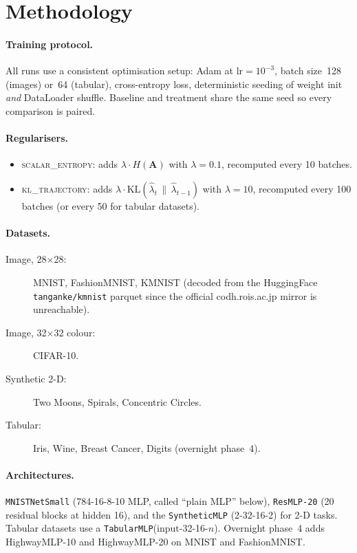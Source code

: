 \documentclass[11pt,a4paper]{article}
\newcommand{\scalarH}{\textsc{scalar\_entropy}\xspace}
\newcommand{\klT}{\textsc{kl\_trajectory}\xspace}
\begin{document}
\section{Methodology}

\paragraph{Training protocol.}
All runs use a consistent optimisation setup: Adam at $\text{lr}=10^{-3}$,
batch size~128 (images) or~64 (tabular), cross-entropy loss,
deterministic seeding of weight init \emph{and} DataLoader shuffle.
Baseline and treatment share the same seed so every comparison is
paired.

\paragraph{Regularisers.}
\begin{itemize}
  \item \scalarH: adds $\lambda\cdot H(\mathbf{A})$ with $\lambda=0.1$,
    recomputed every 10 batches.
  \item \klT: adds $\lambda\cdot\mathrm{KL}(\hat\lambda_t\,\|\,\hat\lambda_{t-1})$
    with $\lambda=10$, recomputed every 100 batches
    (or every 50 for tabular datasets).
\end{itemize}

\paragraph{Datasets.}
\begin{description}
  \item[Image, 28$\times$28:] MNIST, FashionMNIST, KMNIST
    (decoded from the HuggingFace \texttt{tanganke/kmnist} parquet
    since the official codh.rois.ac.jp mirror is unreachable).
  \item[Image, 32$\times$32 colour:] CIFAR-10.
  \item[Synthetic 2-D:] Two Moons, Spirals, Concentric Circles.
  \item[Tabular:] Iris, Wine, Breast Cancer, Digits (overnight phase~4).
\end{description}

\paragraph{Architectures.}
\texttt{MNISTNetSmall} (784-16-8-10 MLP, called ``plain MLP'' below),
\texttt{ResMLP-20} (20 residual blocks at hidden 16), and the
\texttt{SyntheticMLP} (2-32-16-2) for 2-D tasks.
Tabular datasets use a \texttt{TabularMLP}($\text{input}$-32-16-$n$).
Overnight phase~4 adds HighwayMLP-10 and HighwayMLP-20 on MNIST and
FashionMNIST.
\end{document}
